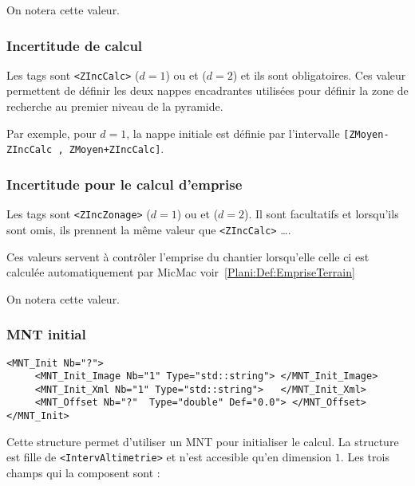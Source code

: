 On notera \PxMoy cette valeur.



\subsubsection{Incertitude de calcul}

Les tags sont  {\tt   <ZIncCalc>} ($d=1$) ou {\tt <Px1IncCalc>} et
{\tt <Px2IncCalc>} ($d=2$) et  ils sont obligatoires. Ces valeur
permettent de d\'efinir les deux nappes encadrantes utilis\'ees
pour d\'efinir la zone de recherche au premier niveau de la pyramide.

Par exemple, pour $d=1$, la nappe initiale est d\'efinie par 
l'intervalle {\tt [ZMoyen-ZIncCalc , ZMoyen+ZIncCalc]}.


\subsubsection{Incertitude pour le calcul d'emprise}

Les tags sont  {\tt   <ZIncZonage>} ($d=1$) ou {\tt <Px1IncZonage>} et
{\tt <Px2IncZonage>} ($d=2$). Il sont facultatifs et lorsqu'ils sont
omis, ils prennent la m\^eme valeur que {\tt   <ZIncCalc>} \dots .

Ces valeurs servent \`a contr\^oler l'emprise du chantier lorsqu'elle celle
ci est calcul\'ee automatiquement par MicMac voir~\ref{Plani:Def:EmpriseTerrain}

On notera \PxZone cette valeur.


\subsubsection{MNT initial}

\label{MNT:INIT}

\begin{verbatim}
<MNT_Init Nb="?">
     <MNT_Init_Image Nb="1" Type="std::string"> </MNT_Init_Image>
     <MNT_Init_Xml Nb="1" Type="std::string">   </MNT_Init_Xml>
     <MNT_Offset Nb="?"  Type="double" Def="0.0"> </MNT_Offset>
</MNT_Init>
\end{verbatim}

Cette structure permet d'utiliser un MNT pour initialiser le
calcul. La structure est fille de {\tt <IntervAltimetrie>} et
n'est accesible qu'en dimension $1$. Les trois champs qui
la composent sont :


